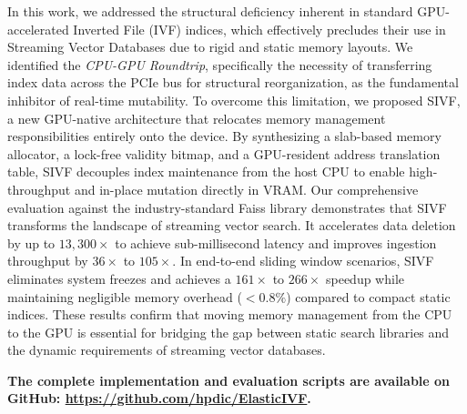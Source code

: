 \documentclass[sigconf,nonacm]{acmart}
\theoremstyle{plain}
\theoremstyle{definition}
\theoremstyle{remark}
\begin{document}
In this work, we addressed the structural deficiency inherent in standard GPU-accelerated Inverted File (IVF) indices, which effectively precludes their use in Streaming Vector Databases due to rigid and static memory layouts. We identified the \textit{CPU-GPU Roundtrip}, specifically the necessity of transferring index data across the PCIe bus for structural reorganization, as the fundamental inhibitor of real-time mutability.
To overcome this limitation, we proposed SIVF, a new GPU-native architecture that relocates memory management responsibilities entirely onto the device. By synthesizing a slab-based memory allocator, a lock-free validity bitmap, and a GPU-resident address translation table, SIVF decouples index maintenance from the host CPU to enable high-throughput and in-place mutation directly in VRAM.
Our comprehensive evaluation against the industry-standard Faiss library demonstrates that SIVF transforms the landscape of streaming vector search. It accelerates data deletion by up to $13,300\times$ to achieve sub-millisecond latency and improves ingestion throughput by $36\times$ to $105\times$. In end-to-end sliding window scenarios, SIVF eliminates system freezes and achieves a $161\times$ to $266\times$ speedup while maintaining negligible memory overhead ($<0.8\%$) compared to compact static indices. These results confirm that moving memory management from the CPU to the GPU is essential for bridging the gap between static search libraries and the dynamic requirements of streaming vector databases.

\noindent
\textbf{The complete implementation and evaluation scripts are available on GitHub: \url{https://github.com/hpdic/ElasticIVF}.}



\end{document}
